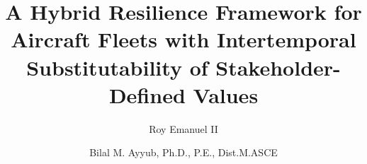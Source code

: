 \documentclass[preprint,12pt]{elsarticle}
\begin{document}
\begin{frontmatter}


\title{A Hybrid Resilience Framework for Aircraft Fleets with Intertemporal Substitutability of Stakeholder-Defined Values}
% 
% 




\author{Roy Emanuel II}

\address{Center for Technology and Systems Management\\
Department of Civil and Environmental Engineering\\
University of Maryland, College Park\\
Maryland, United States}

\author{Bilal M. Ayyub, Ph.D., P.E., Dist.M.ASCE}

\address{Center for Technology and Systems Management\\
Department of Civil and Environmental Engineering\\
University of Maryland, College Park\\
Maryland, United States}
\begin{abstract}


\end{abstract}
\end{frontmatter}
\end{document}
